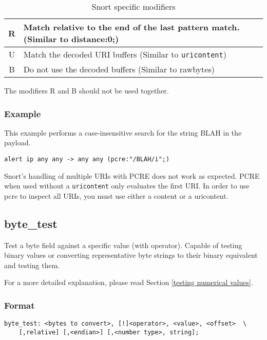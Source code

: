 \documentclass[english]{report}
\newenvironment{note}{
\samepage
    \vspace{10pt}{\textsf{
        {\hspace{7pt}\Huge{$\triangle$\hspace{-12.5pt}{\Large{$^!$}}}}\hspace{5pt}
        {\Large{NOTE}}
    }
    }
   \begin{center}
    \par\vspace{-17pt}

    \begin{lrbox}{\savepar}
    \begin{minipage}[r]{6in}
}
{
    \end{minipage}
    \end{lrbox}
    \fbox{
        \usebox{
            \savepar
	}
    }
    \par\vskip10pt
    \end{center}
}
\newenvironment{note}{
        \begin{rawhtml}
        <p><table border="1"><tr><td><b>
        Note:&nbsp;&nbsp;</b>
        \end{rawhtml}
}{
        \begin{rawhtml}
        </b></td></tr></table></p>
        \end{rawhtml}
}
\begin{document}
\begin{longtable}{|c|p{3.5in}|}
\caption{Snort specific modifiers} \\
\hline
R & Match relative to the end of the last pattern match.  (Similar to distance:0;) \\
\hline
U & Match the decoded URI buffers (Similar to \texttt{uricontent}) \\
\hline
B & Do not use the decoded buffers (Similar to rawbytes) \\
\hline
\end{longtable}

The modifiers R and B should not be used together.

\subsubsection{Example}

This example performs a case-insensitive search for the string BLAH in the payload.

\begin{verbatim}
alert ip any any -> any any (pcre:"/BLAH/i";)
\end{verbatim}

\begin{note}
Snort's handling of multiple URIs with PCRE does not work as expected.  PCRE when used without a \texttt{uricontent} only evaluates the first URI.  In order to use pcre to inspect all URIs, you must use either a content or a uricontent.
\end{note}

\subsection{byte\_test\label{sub:byte_test}}

Test a byte field against a specific value (with operator).  Capable
 of testing binary values or converting representative byte strings to
their binary equivalent and testing them.

For a more detailed explanation, please read Section \ref{testing numerical values}.

\subsubsection{Format}

\begin{verbatim}
byte_test: <bytes to convert>, [!]<operator>, <value>, <offset>  \
    [,relative] [,<endian>] [,<number type>, string];
\end{verbatim}
			
\end{document}
